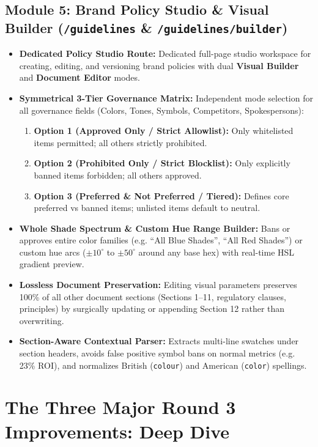 \documentclass[11pt,a4paper]{article}
\begin{document}
\subsection{Module 5: Brand Policy Studio \& Visual Builder (\texttt{/guidelines} \& \texttt{/guidelines/builder})}
\begin{itemize}[leftmargin=1cm]
    \item \textbf{Dedicated Policy Studio Route:} Dedicated full-page studio workspace for creating, editing, and versioning brand policies with dual \textbf{Visual Builder} and \textbf{Document Editor} modes.
    \item \textbf{Symmetrical 3-Tier Governance Matrix:} Independent mode selection for all governance fields (Colors, Tones, Symbols, Competitors, Spokespersons):
    \begin{enumerate}[label=\alph*)]
        \item \textbf{Option 1 (Approved Only / Strict Allowlist):} Only whitelisted items permitted; all others strictly prohibited.
        \item \textbf{Option 2 (Prohibited Only / Strict Blocklist):} Only explicitly banned items forbidden; all others approved.
        \item \textbf{Option 3 (Preferred \& Not Preferred / Tiered):} Defines core preferred vs banned items; unlisted items default to neutral.
    \end{enumerate}
    \item \textbf{Whole Shade Spectrum \& Custom Hue Range Builder:} Bans or approves entire color families (e.g. ``All Blue Shades'', ``All Red Shades'') or custom hue arcs ($\pm 10^\circ$ to $\pm 50^\circ$ around any base hex) with real-time HSL gradient preview.
    \item \textbf{Lossless Document Preservation:} Editing visual parameters preserves 100\% of all other document sections (Sections 1--11, regulatory clauses, principles) by surgically updating or appending Section 12 rather than overwriting.
    \item \textbf{Section-Aware Contextual Parser:} Extracts multi-line swatches under section headers, avoids false positive symbol bans on normal metrics (e.g. 23\% ROI), and normalizes British (\texttt{colour}) and American (\texttt{color}) spellings.
\end{itemize}

\newpage

\section{The Three Major Round 3 Improvements: Deep Dive}
\end{document}
